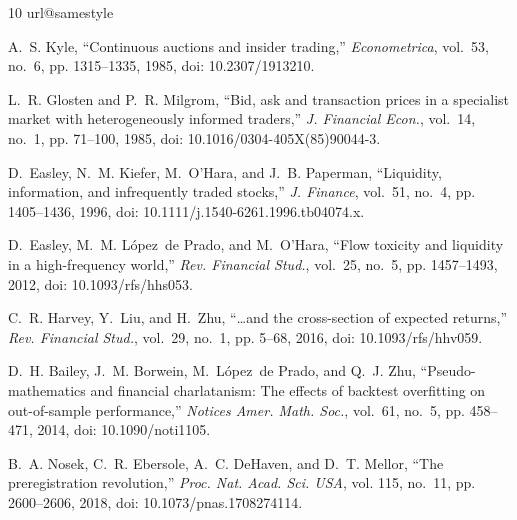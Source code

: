 \documentclass[conference]{IEEEtran}
\begin{document}
\FloatBarrier
\begin{thebibliography}{10}
\providecommand{\url}[1]{#1}
\csname url@samestyle\endcsname
\providecommand{\newblock}{\relax}
\providecommand{\bibinfo}[2]{#2}
\providecommand{\BIBentrySTDinterwordspacing}{\spaceskip=0pt\relax}
\providecommand{\BIBentryALTinterwordstretchfactor}{4}
\providecommand{\BIBentryALTinterwordspacing}{\spaceskip=\fontdimen2\font plus
\BIBentryALTinterwordstretchfactor\fontdimen3\font minus
  \fontdimen4\font\relax}
\providecommand{\BIBforeignlanguage}[2]{{%
\expandafter\ifx\csname l@#1\endcsname\relax
\typeout{** WARNING: IEEEtran.bst: No hyphenation pattern has been}%
\typeout{** loaded for the language `#1'. Using the pattern for}%
\typeout{** the default language instead.}%
\else
\language=\csname l@#1\endcsname
\fi
#2}}
\providecommand{\BIBdecl}{\relax}
\BIBdecl

A.~S. Kyle, ``Continuous auctions and insider trading,'' \emph{Econometrica},
  vol.~53, no.~6, pp. 1315--1335, 1985, doi: \url{10.2307/1913210}.

L.~R. Glosten and P.~R. Milgrom, ``Bid, ask and transaction prices in a
  specialist market with heterogeneously informed traders,'' \emph{J. Financial
  Econ.}, vol.~14, no.~1, pp. 71--100, 1985, doi:
  \url{10.1016/0304-405X(85)90044-3}.

D.~Easley, N.~M. Kiefer, M.~O'Hara, and J.~B. Paperman, ``Liquidity,
  information, and infrequently traded stocks,'' \emph{J. Finance}, vol.~51,
  no.~4, pp. 1405--1436, 1996, doi: \url{10.1111/j.1540-6261.1996.tb04074.x}.

D.~Easley, M.~M. L{\'o}pez~de Prado, and M.~O'Hara, ``Flow toxicity and
  liquidity in a high-frequency world,'' \emph{Rev. Financial Stud.}, vol.~25,
  no.~5, pp. 1457--1493, 2012, doi: \url{10.1093/rfs/hhs053}.

C.~R. Harvey, Y.~Liu, and H.~Zhu, ``{\ldots}and the cross-section of expected
  returns,'' \emph{Rev. Financial Stud.}, vol.~29, no.~1, pp. 5--68, 2016, doi:
  \url{10.1093/rfs/hhv059}.

D.~H. Bailey, J.~M. Borwein, M.~L{\'o}pez~de Prado, and Q.~J. Zhu,
  ``Pseudo-mathematics and financial charlatanism: The effects of backtest
  overfitting on out-of-sample performance,'' \emph{Notices Amer. Math. Soc.},
  vol.~61, no.~5, pp. 458--471, 2014, doi: \url{10.1090/noti1105}.

B.~A. Nosek, C.~R. Ebersole, A.~C. DeHaven, and D.~T. Mellor, ``The
  preregistration revolution,'' \emph{Proc. Nat. Acad. Sci. USA}, vol. 115,
  no.~11, pp. 2600--2606, 2018, doi: \url{10.1073/pnas.1708274114}.


\end{thebibliography}
\end{document}
